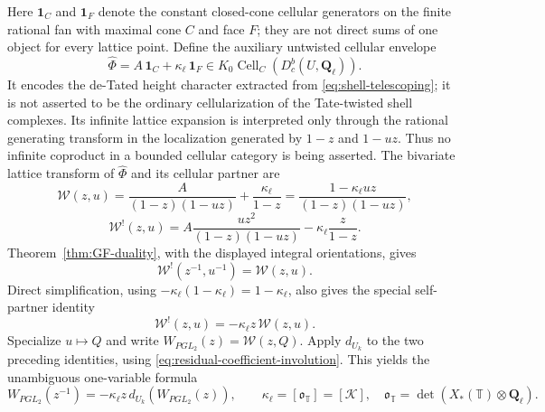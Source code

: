 \documentclass[11pt]{article}
\theoremstyle{definition}
\theoremstyle{remark}
\newcommand{\Qell}{\mathbf Q_\ell}
\newcommand{\Uk}{U_k}
\newcommand{\kappaell}{\kappa_{\ell}}
\newcommand{\one}{\mathbf 1}
\newcommand{\cK}{\mathcal K}
\newcommand{\Cell}{\operatorname{Cell}}
\begin{document}
Here $\one_C$ and $\one_F$ denote the constant closed-cone cellular
generators on the finite rational fan with maximal cone $C$ and face $F$;
they are not direct sums of one object for every lattice point.  Define the
auxiliary untwisted cellular envelope
\begin{equation}
 \widehat\Phi=A\,\one_C+\kappaell\,\one_F
 \in K_0\Cell_C(D_c^b(U,\Qell)).
 \label{eq:residual-skeleton-class}
\end{equation}
It encodes the de-Tated height character extracted from
\eqref{eq:shell-telescoping}; it is not asserted to be the ordinary
cellularization of the Tate-twisted shell complexes.  Its infinite lattice
expansion is interpreted only through the rational
generating transform in the localization generated by $1-z$ and $1-uz$.
Thus no infinite coproduct in a bounded cellular category is being asserted.
The bivariate lattice transform of $\widehat\Phi$ and its cellular partner are
\begin{equation}
 \mathcal W(z,u)
 =\frac{A}{(1-z)(1-uz)}+\frac{\kappaell}{1-z}
 =\frac{1-\kappaell uz}{(1-z)(1-uz)},
 \label{eq:residual-W}
\end{equation}
\begin{equation}
 \mathcal W^!(z,u)
 =A\frac{uz^2}{(1-z)(1-uz)}
 -\kappaell\frac{z}{1-z}.
 \label{eq:residual-partner}
\end{equation}
Theorem~\ref{thm:GF-duality}, with the displayed integral orientations, gives
\begin{equation}
 \mathcal W^!(z^{-1},u^{-1})=\mathcal W(z,u).
 \label{eq:residual-partner-inversion}
\end{equation}
Direct simplification, using $-\kappaell(1-\kappaell)=1-\kappaell$, also gives the
special self-partner identity
\begin{equation}
 \mathcal W^!(z,u)=-\kappaell z\,\mathcal W(z,u).
 \label{eq:residual-partner-identification}
\end{equation}
Specialize $u\mapsto Q$ and write
$W_{PGL_2}(z)=\mathcal W(z,Q)$.  Apply $d_{\Uk}$ to
the two preceding identities, using
\eqref{eq:residual-coefficient-involution}.  This yields the unambiguous
one-variable formula
\begin{equation}
 \boxed{W_{PGL_2}(z^{-1})
 =-\kappaell z\,d_{\Uk}(W_{PGL_2}(z)),
 \qquad \kappaell=[\mathfrak o_{\mathbb T}]=[\cK],\quad
 \mathfrak o_{\mathbb T}=\det(X_*(\mathbb T)\otimes\Qell).}
 \label{eq:quadratic-residual-orientation-reciprocity}
\end{equation}
\end{document}
